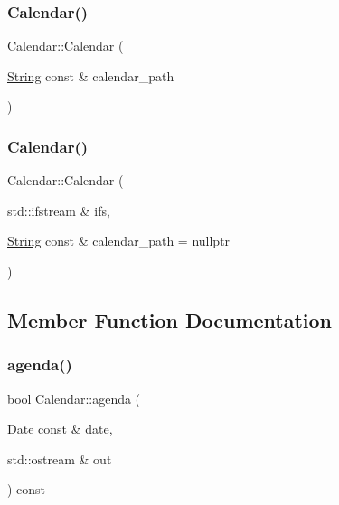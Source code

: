\mbox{\label{classCalendar_a54d7e31f38979ee7a363594b86ca9419}} 
\subsubsection{\texorpdfstring{Calendar()}{Calendar()}\hspace{0.1cm}{\footnotesize\ttfamily [2/3]}}
{\footnotesize\ttfamily Calendar\+::\+Calendar (\begin{DoxyParamCaption}\item[{\hyperlink{classString}{String} const \&}]{calendar\+\_\+path }\end{DoxyParamCaption})}

\mbox{\label{classCalendar_a346673cf7dd15ffa3a2ea292703c5421}} 
\subsubsection{\texorpdfstring{Calendar()}{Calendar()}\hspace{0.1cm}{\footnotesize\ttfamily [3/3]}}
{\footnotesize\ttfamily Calendar\+::\+Calendar (\begin{DoxyParamCaption}\item[{std\+::ifstream \&}]{ifs,  }\item[{\hyperlink{classString}{String} const \&}]{calendar\+\_\+path = {\ttfamily nullptr} }\end{DoxyParamCaption})}



\subsection{Member Function Documentation}
\mbox{\label{classCalendar_ac6112aa4e9b3e6e5b9a478ff66789d77}} 
\subsubsection{\texorpdfstring{agenda()}{agenda()}}
{\footnotesize\ttfamily bool Calendar\+::agenda (\begin{DoxyParamCaption}\item[{\hyperlink{classDate}{Date} const \&}]{date,  }\item[{std\+::ostream \&}]{out }\end{DoxyParamCaption}) const}

